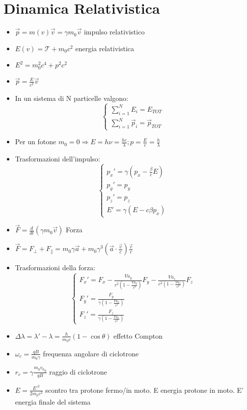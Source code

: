 \documentclass[a4paper]{article}
\begin{document}
    \section{Dinamica Relativistica}
        \begin{itemize}
            \item $\vec{p}=m(v)\vec{v}=\gamma m_0\vec{v}$ impulso relativistico
            \item $E(v)=\mathcal{T}+m_0c^2$ energia relativistica
            \item $E^2=m_0^2c^4+p^2c^2$
            \item $\vec{p}=\frac{E}{c^2}\vec{v}$
            \item In un sistema di N particelle valgono:\\
                $$\begin{cases}
                    \sum_{i=1}^{N}E_i=E_{TOT}\\
                    \sum_{i=1}^{N}\vec{p}_i=\vec{p}_{TOT}
                \end{cases}$$
            \item Per un fotone $m_0=0\Rightarrow E=h\nu=\frac{hc}{\lambda}; p=\frac{E}{c}=\frac{h}{\lambda}$ 
            \item Trasformazioni dell'impulso:\\
                $$\begin{cases}
                    p_x'=\gamma\left(p_x-\frac{\beta}{c}E\right)\\
                    p_y'=p_y\\
                    p_z'=p_z\\
                    E'=\gamma(E-c\beta p_x)
                \end{cases}$$
            \item $\vec{F}=\frac{d}{dt}(\gamma m_0\vec{v})$ Forza
            \item $\vec{F}=F_\perp+F_\|=m_0\gamma\vec{a}+m_0\gamma^3\left(\vec{a}\cdot\frac{\vec{v}}{c}\right)\frac{\vec{v}}{c}$
            \item Trasformazioni della forza:\\
                $$\begin{cases}
                    F_x'=F_x-\frac{Vu_y}{c^2\left(1-\frac{Vu_y}{c^2}\right)}F_y-\frac{Vu_z}{c^2\left(1-\frac{Vu_z}{c^2}\right)}F_z\\
                    F_y'=\frac{F_y}{\gamma\left(1-\frac{Vu_x}{c^2}\right)}\\
                    F_z'=\frac{F_z}{\gamma\left(1-\frac{Vu_x}{c^2}\right)}
                \end{cases}$$
            \item $\Delta\lambda=\lambda'-\lambda=\frac{h}{m_0c}(1-\cos{\theta})$ effetto Compton
            \item $\omega_c=\frac{qB}{m_0\gamma}$ frequenza angolare di ciclotrone
            \item $r_c=\gamma\frac{m_0{v_0}_y}{qB}$ raggio di ciclotrone
            \item $E=\frac{{E'}^2}{2m_pc^2}$ scontro tra protone fermo/in moto. E energia protone in moto. E' energia finale del sistema
        \end{itemize}
\end{document}
